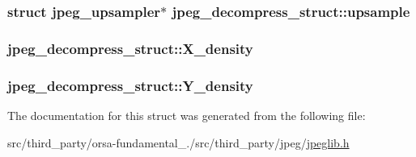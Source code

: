 \subsubsection[{upsample}]{\setlength{\rightskip}{0pt plus 5cm}struct {\bf jpeg\+\_\+upsampler}$\ast$ jpeg\+\_\+decompress\+\_\+struct\+::upsample}\label{structjpeg__decompress__struct_a80ad7e1c14488a065697b09679479c5d}
\hypertarget{structjpeg__decompress__struct_a69f0da1031f16c621438d123921ba745}{}
\subsubsection[{X\+\_\+density}]{ jpeg\+\_\+decompress\+\_\+struct\+::\+X\+\_\+density}\label{structjpeg__decompress__struct_a69f0da1031f16c621438d123921ba745}
\hypertarget{structjpeg__decompress__struct_a2bfa78f638ae718f6601fd64a3b9f7aa}{}
\subsubsection[{Y\+\_\+density}]{ jpeg\+\_\+decompress\+\_\+struct\+::\+Y\+\_\+density}\label{structjpeg__decompress__struct_a2bfa78f638ae718f6601fd64a3b9f7aa}


The documentation for this struct was generated from the following file\+:\begin{DoxyCompactItemize}
\item 
src/third\+\_\+party/orsa-\/fundamental\+\_./src/third\+\_\+party/jpeg/\hyperlink{jpeglib_8h}{jpeglib.\+h}\end{DoxyCompactItemize}
